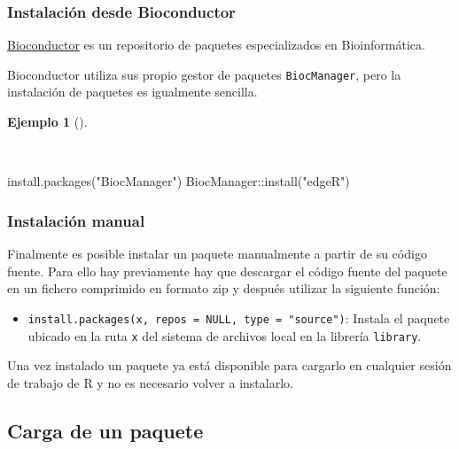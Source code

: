 \documentclass[
  a4paper,
]{scrreport}
\newenvironment{Shaded}{\begin{snugshade}}{\end{snugshade}}
\newcommand{\FunctionTok}[1]{\textcolor[rgb]{0.28,0.35,0.67}{#1}}
\newcommand{\NormalTok}[1]{\textcolor[rgb]{0.00,0.23,0.31}{#1}}
\newcommand{\SpecialCharTok}[1]{\textcolor[rgb]{0.37,0.37,0.37}{#1}}
\newcommand{\StringTok}[1]{\textcolor[rgb]{0.13,0.47,0.30}{#1}}
\providecommand{\tightlist}{%
  \setlength{\itemsep}{0pt}\setlength{\parskip}{0pt}}\usepackage{longtable,booktabs,array}
\theoremstyle{definition}
\theoremstyle{definition}
\newtheorem{example}{Ejemplo}[chapter]
\theoremstyle{remark}
\begin{document}
\subsubsection{Instalación desde
Bioconductor}\label{instalaciuxf3n-desde-bioconductor}

\href{https://bioconductor.org/}{Bioconductor} es un repositorio de
paquetes especializados en Bioinformática.

Bioconductor utiliza sus propio gestor de paquetes \texttt{BiocManager},
pero la instalación de paquetes es igualmente sencilla.

\begin{example}[]\protect\hypertarget{exm-instalacion-paquetes-bioconductor}{}\label{exm-instalacion-paquetes-bioconductor}

~

\begin{Shaded}
\begin{Highlighting}[]
\FunctionTok{install.packages}\NormalTok{(}\StringTok{"BiocManager"}\NormalTok{)}
\NormalTok{BiocManager}\SpecialCharTok{::}\FunctionTok{install}\NormalTok{(}\StringTok{"edgeR"}\NormalTok{)}
\end{Highlighting}
\end{Shaded}

\end{example}

\subsubsection{Instalación manual}\label{instalaciuxf3n-manual}

Finalmente es posible instalar un paquete manualmente a partir de su
código fuente. Para ello hay previamente hay que descargar el código
fuente del paquete en un fichero comprimido en formato zip y después
utilizar la siguiente función:

\begin{itemize}
\tightlist
\item
  \texttt{install.packages(x,\ repos\ =\ NULL,\ type\ =\ "source")}:
  Instala el paquete ubicado en la ruta \texttt{x} del sistema de
  archivos local en la librería \texttt{library}.
\end{itemize}

Una vez instalado un paquete ya está disponible para cargarlo en
cualquier sesión de trabajo de R y no es necesario volver a instalarlo.

\subsection{Carga de un paquete}\label{carga-de-un-paquete}
\end{document}
